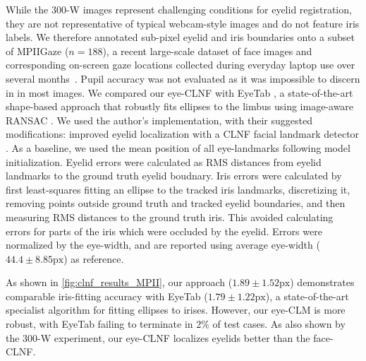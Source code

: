 While the 300-W images represent challenging conditions for eyelid registration, they are not representative of typical webcam-style images and do not feature iris labels.
We therefore annotated sub-pixel eyelid and iris boundaries onto a subset of MPIIGaze ($n\!=\!188$), a recent large-scale dataset of face images and corresponding on-screen gaze locations collected during everyday laptop use over several months~\cite{zhang15_cvpr}.
Pupil accuracy was not evaluated as it was impossible to discern in in most images.
We compared our eye-CLNF with EyeTab \cite{wood2014eyetab}, a state-of-the-art shape-based approach that robustly fits ellipses to the limbus using image-aware RANSAC \cite{swirski2012robust}.
We used the author's implementation, with their suggested modifications: improved eyelid localization with a CLNF facial landmark detector \cite{baltrusaitis2013constrained}.
As a baseline, we used the mean position of all eye-landmarks following model initialization.
Eyelid errors were calculated as RMS distances from eyelid landmarks to the ground truth eyelid boudnary.
Iris errors were calculated by first least-squares fitting an ellipse to the tracked iris landmarks, discretizing it, removing points outside ground truth and tracked eyelid boundaries, and then measuring RMS distances to the ground truth iris.
This avoided calculating errors for parts of the iris which were occluded by the eyelid.
Errors were normalized by the eye-width, and are reported using average eye-width ($44.4\!\pm\!8.85\textrm{px}$) as reference.

As shown in \autoref{fig:clnf_results_MPII}, our approach ($1.89\!\pm\!1.52\textrm{px}$) demonstrates comparable iris-fitting accuracy with EyeTab ($1.79\!\pm\!1.22\textrm{px}$), a state-of-the-art specialist algorithm for fitting ellipses to irises. However, our eye-CLM is more robust, with EyeTab failing to terminate in $2\%$ of test cases. As also shown by the 300-W experiment, our eye-CLNF localizes eyelids better than the face-CLNF.


